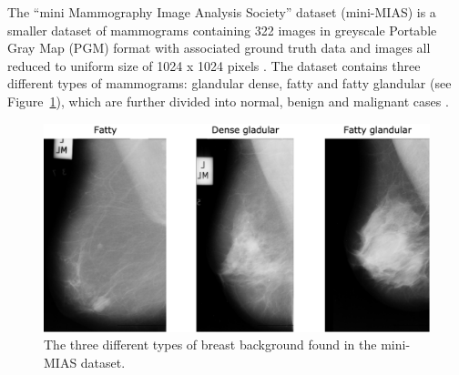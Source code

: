 The ``mini Mammography Image Analysis Society'' dataset (mini-MIAS) is a smaller dataset of mammograms containing 322 images in greyscale Portable Gray Map (PGM) format with associated ground truth data \citep{Suckling1994} and images all reduced to uniform size of 1024 x 1024 pixels \citep{Vishrutha2014}. The dataset contains three different types of mammograms: glandular dense, fatty and fatty glandular (see Figure~\ref{fig:ethics-datasets-mini-mias breast background}), which are further divided into normal, benign and malignant cases \citep{Hepsag2017}.

\begin{figure}[ht]
\centerline{\includegraphics[width=\textwidth]{figures/ethics-datasets/mini-mias breast background.png}}
\caption{\label{fig:ethics-datasets-mini-mias breast background}The three different types of breast background found in the mini-MIAS dataset.}
\end{figure}